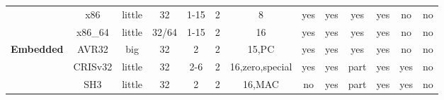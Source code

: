 \begin{sidewaystable}[tbp]
\begin{sf}
\begin{footnotesize}
\begin{center}
\begin{tabular}{|c|c||c|c|c|c|c|c|c|c|c|c|c|}
                 & %
x86              & %
little           & %
32               & %
1-15             & %
2                & %
8                & %
yes              & %
yes              & %
yes              & %
yes              & %
no               & %
no                 %
\\
\cline{2-13}

		 & %
x86\_64          & %
little           & %
32/64            & %
1-15             & %
2                & %
16               & %
yes              & %
yes              & %
yes              & %
yes              & %
no               & %
no                 %
\\

\hline\hline


\multirow{4}{*}{\bf Embedded} &
AVR32            & %
big              & %
32               & %
2                & %
2                & %
15,PC            & %
yes              & %
yes              & %
yes              & %
yes              & %
no               & %
no                 %
\\
\cline{2-13}

                 & %
CRISv32          & %
little           & %
32               & %
2-6              & %
2                & %
16,zero,special  & %
yes              & %
yes              & %
part             & %
yes              & %
yes              & %
no                 %
\\
\cline{2-13}

                 & %
SH3              & %
little           & %
32               & %
2                & %
2                & %
16,MAC           & %
no               & %
yes              & %
part             & %
yes              & %
yes              & %
no                 %
\\
\cline{2-13}


\end{tabular}
\end{center}
\end{footnotesize}
\end{sf}
\end{sidewaystable}
